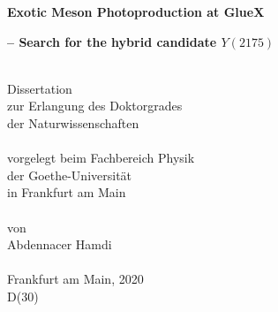 
\begin{titlepage}
\thispagestyle{empty}

\begin{center}
{\LARGE\bf Exotic Meson Photoproduction at GlueX}
\par
{\Large\bf -- Search for the hybrid candidate $Y(2175)$}
\par
\mbox{}\\[1.5cm]
{\large Dissertation\\
zur Erlangung des Doktorgrades\\
der Naturwissenschaften}\\
\mbox{}\\[1.5cm]
{\large vorgelegt beim Fachbereich Physik\\
der Goethe-Universit\"at \\
in Frankfurt am Main}\\
\mbox{}\\[1.5cm]
{\large von}\\
\vspace{3mm}
{\large Abdennacer Hamdi}\\
\mbox{}\\[1.5cm]
{\large Frankfurt am Main, 2020}\\
\vspace{4mm}
{\large D(30)}
\end{center}

\newpage
\thispagestyle{empty}
\end{titlepage}